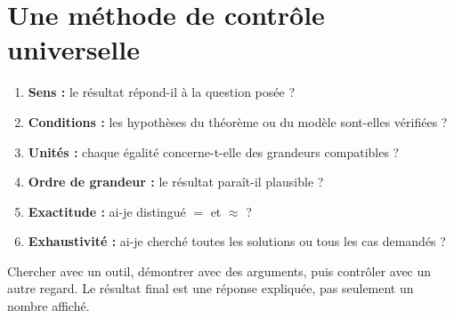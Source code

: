 \documentclass[../cours_3e.tex]{subfiles}
\begin{document}
\section{Une méthode de contrôle universelle}
\begin{enumerate}
\item \textbf{Sens :} le résultat répond-il à la question posée ?
\item \textbf{Conditions :} les hypothèses du théorème ou du modèle sont-elles vérifiées ?
\item \textbf{Unités :} chaque égalité concerne-t-elle des grandeurs compatibles ?
\item \textbf{Ordre de grandeur :} le résultat paraît-il plausible ?
\item \textbf{Exactitude :} ai-je distingué $=$ et $\approx$ ?
\item \textbf{Exhaustivité :} ai-je cherché toutes les solutions ou tous les cas demandés ?
\end{enumerate}
\begin{retenir}
Chercher avec un outil, démontrer avec des arguments, puis contrôler avec un autre regard. Le résultat final est une réponse expliquée, pas seulement un nombre affiché.
\end{retenir}
\end{document}
